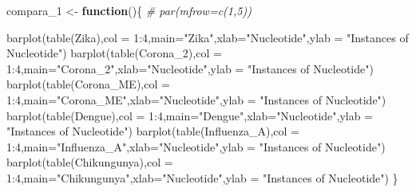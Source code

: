 \documentclass[
]{article}
\newenvironment{Shaded}{\begin{snugshade}}{\end{snugshade}}
\newcommand{\AttributeTok}[1]{\textcolor[rgb]{0.77,0.63,0.00}{#1}}
\newcommand{\CommentTok}[1]{\textcolor[rgb]{0.56,0.35,0.01}{\textit{#1}}}
\newcommand{\ControlFlowTok}[1]{\textcolor[rgb]{0.13,0.29,0.53}{\textbf{#1}}}
\newcommand{\DecValTok}[1]{\textcolor[rgb]{0.00,0.00,0.81}{#1}}
\newcommand{\FunctionTok}[1]{\textcolor[rgb]{0.00,0.00,0.00}{#1}}
\newcommand{\NormalTok}[1]{#1}
\newcommand{\OtherTok}[1]{\textcolor[rgb]{0.56,0.35,0.01}{#1}}
\newcommand{\SpecialCharTok}[1]{\textcolor[rgb]{0.00,0.00,0.00}{#1}}
\newcommand{\StringTok}[1]{\textcolor[rgb]{0.31,0.60,0.02}{#1}}
\begin{document}
\begin{Shaded}
\begin{Highlighting}[]
\NormalTok{compara\_1 }\OtherTok{\textless{}{-}} \ControlFlowTok{function}\NormalTok{()\{}
  \CommentTok{\# par(mfrow=c(1,5))}
  
  \FunctionTok{barplot}\NormalTok{(}\FunctionTok{table}\NormalTok{(Zika),}\AttributeTok{col =} \DecValTok{1}\SpecialCharTok{:}\DecValTok{4}\NormalTok{,}\AttributeTok{main=}\StringTok{"Zika"}\NormalTok{,}\AttributeTok{xlab=}\StringTok{"Nucleotide"}\NormalTok{,}\AttributeTok{ylab =} \StringTok{"Instances of Nucleotide"}\NormalTok{)}
  \FunctionTok{barplot}\NormalTok{(}\FunctionTok{table}\NormalTok{(Corona\_2),}\AttributeTok{col =} \DecValTok{1}\SpecialCharTok{:}\DecValTok{4}\NormalTok{,}\AttributeTok{main=}\StringTok{"Corona\_2"}\NormalTok{,}\AttributeTok{xlab=}\StringTok{"Nucleotide"}\NormalTok{,}\AttributeTok{ylab =} \StringTok{"Instances of Nucleotide"}\NormalTok{)}
  \FunctionTok{barplot}\NormalTok{(}\FunctionTok{table}\NormalTok{(Corona\_ME),}\AttributeTok{col =} \DecValTok{1}\SpecialCharTok{:}\DecValTok{4}\NormalTok{,}\AttributeTok{main=}\StringTok{"Corona\_ME"}\NormalTok{,}\AttributeTok{xlab=}\StringTok{"Nucleotide"}\NormalTok{,}\AttributeTok{ylab =} \StringTok{"Instances of Nucleotide"}\NormalTok{)}
  \FunctionTok{barplot}\NormalTok{(}\FunctionTok{table}\NormalTok{(Dengue),}\AttributeTok{col =} \DecValTok{1}\SpecialCharTok{:}\DecValTok{4}\NormalTok{,}\AttributeTok{main=}\StringTok{"Dengue"}\NormalTok{,}\AttributeTok{xlab=}\StringTok{"Nucleotide"}\NormalTok{,}\AttributeTok{ylab =} \StringTok{"Instances of Nucleotide"}\NormalTok{)}
  \FunctionTok{barplot}\NormalTok{(}\FunctionTok{table}\NormalTok{(Influenza\_A),}\AttributeTok{col =} \DecValTok{1}\SpecialCharTok{:}\DecValTok{4}\NormalTok{,}\AttributeTok{main=}\StringTok{"Influenza\_A"}\NormalTok{,}\AttributeTok{xlab=}\StringTok{"Nucleotide"}\NormalTok{,}\AttributeTok{ylab =} \StringTok{"Instances of Nucleotide"}\NormalTok{)}
  \FunctionTok{barplot}\NormalTok{(}\FunctionTok{table}\NormalTok{(Chikungunya),}\AttributeTok{col =} \DecValTok{1}\SpecialCharTok{:}\DecValTok{4}\NormalTok{,}\AttributeTok{main=}\StringTok{"Chikungunya"}\NormalTok{,}\AttributeTok{xlab=}\StringTok{"Nucleotide"}\NormalTok{,}\AttributeTok{ylab =} \StringTok{"Instances of Nucleotide"}\NormalTok{)}
\NormalTok{\}}


\end{Highlighting}
\end{Shaded}
\end{document}
